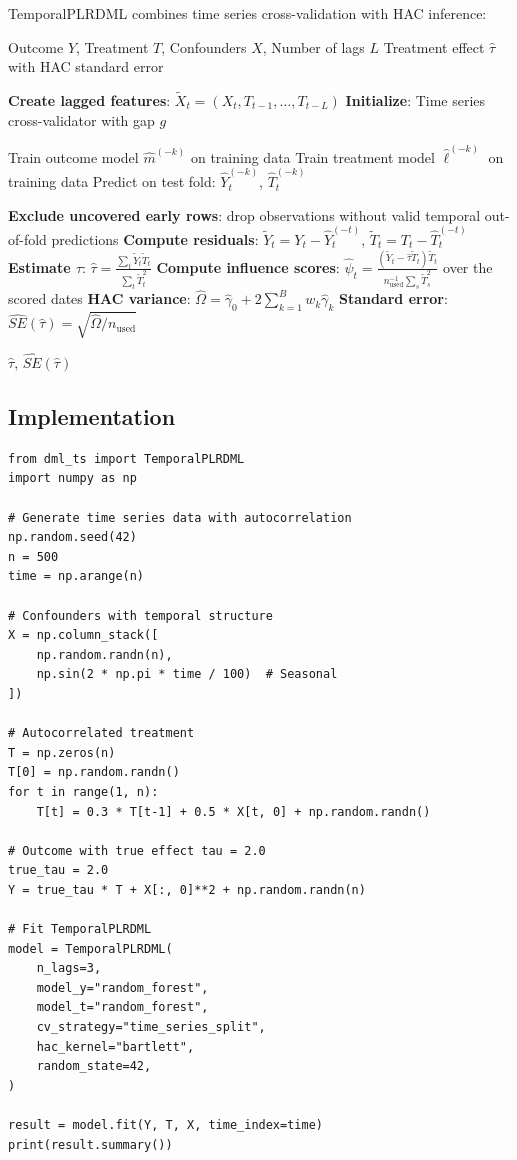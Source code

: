 TemporalPLRDML combines time series cross-validation with HAC inference:

\begin{algorithm}[H]
\caption{TemporalPLRDML Estimation}
\label{alg:temporal_plr_dml}
\begin{algorithmic}[1]
\REQUIRE Outcome $Y$, Treatment $T$, Confounders $X$, Number of lags $L$
\ENSURE Treatment effect $\hat{\tau}$ with HAC standard error

\STATE \textbf{Create lagged features}: $\tilde{X}_t = (X_t, T_{t-1}, \ldots, T_{t-L})$
\STATE \textbf{Initialize}: Time series cross-validator with gap $g$

    \STATE Train outcome model $\hat{m}^{(-k)}$ on training data
    \STATE Train treatment model $\hat{\ell}^{(-k)}$ on training data
    \STATE Predict on test fold: $\hat{Y}^{(-k)}_t$, $\hat{T}^{(-k)}_t$
\ENDFOR

\STATE \textbf{Exclude uncovered early rows}: drop observations without valid temporal out-of-fold predictions
\STATE \textbf{Compute residuals}: $\tilde{Y}_t = Y_t - \hat{Y}^{(-t)}_t$, $\tilde{T}_t = T_t - \hat{T}^{(-t)}_t$
\STATE \textbf{Estimate $\tau$}: $\hat{\tau} = \frac{\sum_t \tilde{Y}_t \tilde{T}_t}{\sum_t \tilde{T}_t^2}$
\STATE \textbf{Compute influence scores}: $\hat{\psi}_t = \frac{(\tilde{Y}_t - \hat{\tau}\tilde{T}_t)\tilde{T}_t}{n_{\mathrm{used}}^{-1}\sum_s\tilde{T}_s^2}$ over the scored dates
\STATE \textbf{HAC variance}: $\hat{\Omega} = \hat{\gamma}_0 + 2\sum_{k=1}^{B} w_k \hat{\gamma}_k$
\STATE \textbf{Standard error}: $\widehat{SE}(\hat{\tau}) = \sqrt{\hat{\Omega}/n_{\mathrm{used}}}$

\RETURN $\hat{\tau}$, $\widehat{SE}(\hat{\tau})$
\end{algorithmic}
\end{algorithm}

\subsection{Implementation}

\begin{verbatim}
from dml_ts import TemporalPLRDML
import numpy as np

# Generate time series data with autocorrelation
np.random.seed(42)
n = 500
time = np.arange(n)

# Confounders with temporal structure
X = np.column_stack([
    np.random.randn(n),
    np.sin(2 * np.pi * time / 100)  # Seasonal
])

# Autocorrelated treatment
T = np.zeros(n)
T[0] = np.random.randn()
for t in range(1, n):
    T[t] = 0.3 * T[t-1] + 0.5 * X[t, 0] + np.random.randn()

# Outcome with true effect tau = 2.0
true_tau = 2.0
Y = true_tau * T + X[:, 0]**2 + np.random.randn(n)

# Fit TemporalPLRDML
model = TemporalPLRDML(
    n_lags=3,
    model_y="random_forest",
    model_t="random_forest",
    cv_strategy="time_series_split",
    hac_kernel="bartlett",
    random_state=42,
)

result = model.fit(Y, T, X, time_index=time)
print(result.summary())
\end{verbatim}

